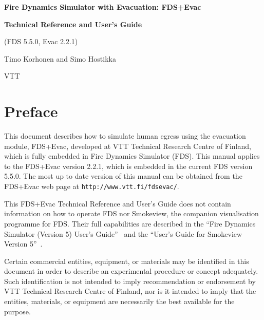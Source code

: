 \documentclass[12pt,a4paper,final,twoside]{stylevk}
\begin{document}
\begin{titlepage}
\begin{center}
    { \normalfont\fontsize{28}{42}\selectfont\bfseries\sffamily
      Fire Dynamics Simulator with Evacuation: FDS+Evac
    }

    \vspace{6mm}

    { \normalfont\fontsize{22}{28}\selectfont\bfseries\sffamily
      Technical Reference and User's Guide }

    { \normalfont\fontsize{14}{18}\selectfont\sffamily
      (FDS 5.5.0, Evac 2.2.1) }

    \vspace{15mm}

    { \normalfont\fontsize{14}{18}\selectfont\sffamily
      Timo Korhonen and Simo Hostikka }

    \vspace{3mm}

    { \normalfont\fontsize{12}{16}\selectfont\sffamily
      VTT}

  \end{center}


\vspace{2cm}
    

\end{titlepage}

\setcounter{page}{4}

\newpage


\chapter*{Preface}

\noindent This document describes how to simulate human egress using
the evacuation module, FDS+Evac, developed at VTT Technical Research
Centre of Finland, which is fully embedded in Fire Dynamics Simulator
(FDS).  This manual applies to the FDS+Evac version 2.2.1, which is
embedded in the current FDS version 5.5.0.  The most up to date
version of this manual can be obtained from the FDS+Evac web page at
\texttt{http://www.vtt.fi/}\linebreak[4]\texttt{fdsevac/}.


This FDS+Evac Technical Reference and User's Guide does not contain
information on how to operate FDS nor Smokeview, the companion
visualisation programme for FDS.  Their full capabilities are
described in the ``Fire Dynamics Simulator (Version 5) User's
Guide''~\cite{FDS_UserGuide} and the ``User's Guide for Smokeview
Version 5''~\cite{SV_UserGuide}.


Certain commercial entities, equipment, or materials may be identified
in this document in order to describe an experimental procedure or
concept adequately.  Such identification is not intended to imply
recommendation or endorsement by VTT Technical Research Centre of
Finland, nor is it intended to imply that the entities, materials, or
equipment are necessarily the best available for the purpose.
\end{document}
